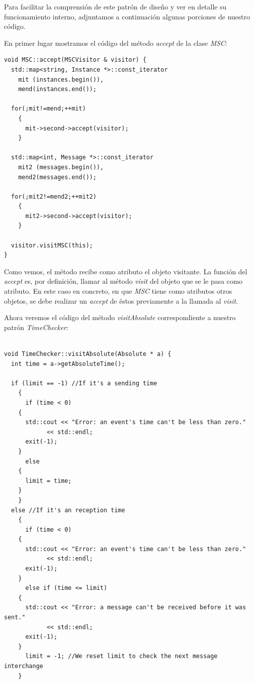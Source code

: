 Para facilitar la comprensión de este patrón de diseño y ver en
detalle su funcionamiento interno,  adjuntamos a continuación algunas
porciones de nuestro código.

En primer lugar mostramos el código del método \textit{accept} de la
clase \textit{MSC}:

\begin{lstlisting}
void MSC::accept(MSCVisitor & visitor) {
  std::map<string, Instance *>::const_iterator
    mit (instances.begin()),
    mend(instances.end());
  
  for(;mit!=mend;++mit) 
    {	
      mit->second->accept(visitor);   
    }
  
  std::map<int, Message *>::const_iterator
    mit2 (messages.begin()),
    mend2(messages.end());
  
  for(;mit2!=mend2;++mit2) 
    {	
      mit2->second->accept(visitor);   
    }
 
  visitor.visitMSC(this);
}
\end{lstlisting}

Como vemos, el método recibe como atributo el objeto visitante. La
función del \textit{accept} es, por definición, llamar al método
\textit{visit} del objeto que se le pasa como atributo. En este caso
en concreto, en que \textit{MSC} tiene como atributos otros objetos,
se debe realizar un \textit{accept} de éstos previamente a la llamada
al \textit{visit}.

Ahora veremos el código del método \textit{visitAbsolute}
correspondiente a nuestro patrón \textit{TimeChecker}:

\begin{lstlisting}

void TimeChecker::visitAbsolute(Absolute * a) {
  int time = a->getAbsoluteTime();
  
  if (limit == -1) //If it's a sending time
    {
      if (time < 0)
	{
	  std::cout << "Error: an event's time can't be less than zero."
		    << std::endl;
	  exit(-1);
	}
      else
	{
	  limit = time;
	}
    }
  else //If it's an reception time
    {
      if (time < 0)
	{
	  std::cout << "Error: an event's time can't be less than zero."
		    << std::endl;
	  exit(-1);
	}
      else if (time <= limit)
	{
	  std::cout << "Error: a message can't be received before it was sent."
		    << std::endl;
	  exit(-1);
	}
      limit = -1; //We reset limit to check the next message interchange
    }

\end{lstlisting}

